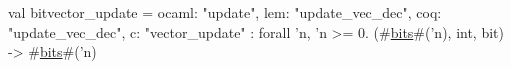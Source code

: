 val bitvector_update = {
  ocaml: "update",
  lem: "update_vec_dec",
  coq: "update_vec_dec",
  c: "vector_update"
} : forall 'n, 'n >= 0. (#\hyperref[zbits]{bits}#('n), int, bit) -> #\hyperref[zbits]{bits}#('n)
